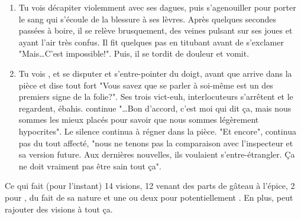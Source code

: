 {\begin{enumerate}
		\item Tu vois \nmPlayerXII décapiter violemment \nmPlayerVI avec ses dagues, puis s'agenouiller pour porter le sang qui s'écoule de la blessure à ses lèvres. Après quelques secondes passées à boire, il se relève brusquement, des veines pulsant sur ses joues et ayant l'air très confus. Il fit quelques pas en titubant avant de s'exclamer "Mais\dots C'est impossible!". Puis, il se tordit de douleur et vomit.
		
		\item Tu vois \nmPlayerII, \nmPlayerI et \nmPlayerIII se disputer et s'entre-pointer du doigt, avant que \nmPlayerIV arrive dans la pièce et dise tout fort "Vous savez que se parler à soi-même est un des premiers signe de la folie?". Ses trois vict-euh, interlocuteurs s'arrêtent et le regardent, ébahis. \nmPlayerIV continue "\dots Bon d'accord, c'est moi qui dit ça, mais nous sommes les mieux placés pour savoir que nous sommes légèrement hypocrites". Le silence continua à régner dans la pièce. "Et encore", continua \nmPlayerIV pas du tout affecté, "nous ne tenons pas la comparaison avec l'inspecteur et sa version future. Aux dernières nouvelles, ils voulaient s'entre-étrangler. Ça ne doit vraiment pas être sain tout ça".
	\end{enumerate}
	
	Ce qui fait (pour l'instant) 14 visions, 12 venant des parts de gâteau à l'épice, 2 pour \nmPlayerIX, du fait de sa nature et une ou deux pour potentiellement \nmPlayerVI. En plus, \nmPlayerIX peut rajouter des visions à tout ça.
}








